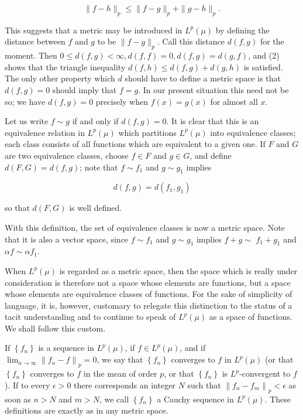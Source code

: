 \documentclass[10pt]{article}
\begin{document}
$$
\|f-h\|_{p} \leq\|f-g\|_{p}+\|g-h\|_{p} .
$$

This suggests that a metric may be introduced in $L^{p}(\mu)$ by defining the distance between $f$ and $g$ to be $\|f-g\|_{p}$. Call this distance $d(f, g)$ for the moment. Then $0 \leq d(f, g)<\infty, d(f, f)=0, d(f, g)=d(g, f)$, and (2) shows that the triangle inequality $d(f, h) \leq d(f, g)+d(g, h)$ is satisfied. The only other property which $d$ should have to define a metric space is that $d(f, g)=0$ should imply that $f=g$. In our present situation this need not be so; we have $d(f, g)=0$ precisely when $f(x)=g(x)$ for almost all $x$.

Let us write $f \sim g$ if and only if $d(f, g)=0$. It is clear that this is an equivalence relation in $L^{p}(\mu)$ which partitions $L^{p}(\mu)$ into equivalence classes; each class consists of all functions which are equivalent to a given one. If $F$ and $G$ are two equivalence classes, choose $f \in F$ and $g \in G$, and define $d(F, G)=d(f, g)$; note that $f \sim f_{1}$ and $g \sim g_{1}$ implies

$$
d(f, g)=d\left(f_{1}, g_{1}\right)
$$

so that $d(F, G)$ is well defined.

With this definition, the set of equivalence classes is now a metric space. Note that it is also a vector space, since $f \sim f_{1}$ and $g \sim g_{1}$ implies $f+g \sim$ $f_{1}+g_{1}$ and $\alpha f \sim \alpha f_{1}$.

When $L^{p}(\mu)$ is regarded as a metric space, then the space which is really under consideration is therefore not a space whose elements are functions, but a space whose elements are equivalence classes of functions. For the sake of simplicity of language, it is, however, customary to relegate this distinction to the status of a tacit understanding and to continue to speak of $L^{p}(\mu)$ as a space of functions. We shall follow this custom.

If $\left\{f_{n}\right\}$ is a sequence in $L^{p}(\mu)$, if $f \in L^{p}(\mu)$, and if $\lim _{n \rightarrow \infty}\left\|f_{n}-f\right\|_{p}=0$, we say that $\left\{f_{n}\right\}$ converges to $f$ in $L^{p}(\mu)$ (or that $\left\{f_{n}\right\}$ converges to $f$ in the mean of order $p$, or that $\left\{f_{n}\right\}$ is $L^{p}$-convergent to $f$ ). If to every $\epsilon>0$ there corresponds an integer $N$ such that $\left\|f_{n}-f_{m}\right\|_{p}<\epsilon$ as soon as $n>N$ and $m>N$, we call $\left\{f_{n}\right\}$ a Cauchy sequence in $L^{p}(\mu)$. These definitions are exactly as in any metric space.
\end{document}

